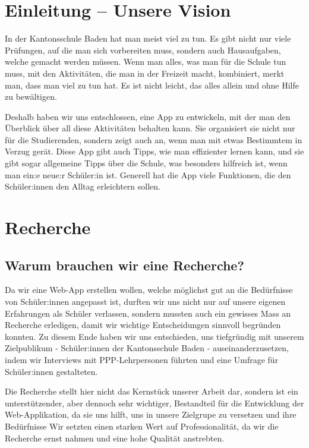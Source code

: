 \documentclass[12pt,a4paper]{report}
\begin{document}
\tableofcontents

\chapter{Einleitung – Unsere Vision}
In der Kantonsschule Baden hat man meist viel zu tun. Es gibt nicht nur viele Prüfungen, auf die man sich vorbereiten muss, sondern auch Hausaufgaben, welche gemacht werden müssen. Wenn man alles, was man für die Schule tun muss, mit den Aktivitäten, die man in der Freizeit macht, kombiniert, merkt man, dass man viel zu tun hat. Es ist nicht leicht, das alles allein und ohne Hilfe zu bewältigen.

Deshalb haben wir uns entschlossen, eine App zu entwickeln, mit der man den Überblick über all diese Aktivitäten behalten kann. Sie organisiert sie nicht nur für die Studierenden, sondern zeigt auch an, wenn man mit etwas Bestimmtem in Verzug gerät. Diese App gibt auch Tipps, wie man effizienter lernen kann, und sie gibt sogar allgemeine Tipps über die Schule, was besonders hilfreich ist, wenn man ein:e neue:r Schüler:in ist. Generell hat die App viele Funktionen, die den Schüler:innen den Alltag erleichtern sollen.

\chapter{Recherche}
\section{Warum brauchen wir eine Recherche?}
Da wir eine Web-App erstellen wollen, welche möglichst gut an die Bedürfnisse von Schüler:innen angepasst ist, durften wir uns nicht nur auf unsere eigenen Erfahrungen als Schüler verlassen, sondern mussten auch ein gewisses Mass an Recherche erledigen, damit wir wichtige Entscheidungen sinnvoll begründen konnten. 
Zu diesem Ende haben wir uns entschieden, uns tiefgründig mit unserem Zielpublikum - Schüler:innen der Kantonsschule Baden - auseinanderzusetzen, indem wir Interviews mit PPP-Lehrpersonen führten und eine Umfrage für Schüler:innen gestalteten.

Die Recherche stellt hier nicht das Kernstück unserer Arbeit dar, sondern ist ein unterstützender, aber dennoch sehr wichtiger, Bestandteil für die Entwicklung der Web-Applikation, da sie uns hilft, uns in unsere Zielgrupe zu versetzen und ihre Bedürfnisse
Wir setzten einen starken Wert auf Professionalität, da wir die Recherche ernst nahmen und eine hohe Qualität anstrebten.
\end{document}
